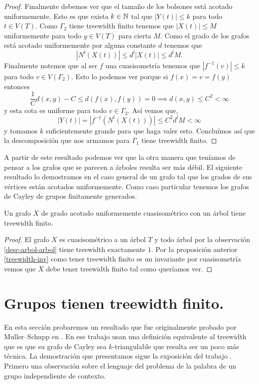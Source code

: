 \documentclass[tesis.tex]{subfiles}
\begin{document}
\begin{proof}
	Finalmente debemos ver que el tamaño de los bolsones está acotado uniformemente.
	Esto es que exista $k \in \mathbb{N}$ tal que $|Y(t)| \le k$ para todo $t \in V(T)$.
	Como $\Gamma_2$ tiene treewidth finito tenemos que $|X(t)| \le M$ uniformemente para todo $y \in V(T)$ para cierta $M$. 
	Como el grado de los grafos está acotado uniformemente por alguna constante $d$ tenemos que 
	\[
	|N^l(X(t))| \le d^l |X(t)| \le d^l M.
	\]
	Finalmente notemos que al ser $f$ una cuasisometría tenemos que $|f^{-1}(v)| \le k$ para todo $v \in V(\Gamma_2)$.
	Esto lo podemos ver porque si $f(x) = v = f(y)$ entonces
	\[
	\frac{1}{C}d(x,y) - C \le d( f(x), f(y) ) = 0 \implies d(x,y) \le C^2 < \infty
	\]
	y esta cota es uniforme para todo $v \in \Gamma_2$. 
	Así vemos que,
	\[
	|Y(t)| = |f^{-1}(N^l(X(t)))| \le C^2 d^l M < \infty
	\]
	y tomamos $k$ suficientemente grande para que haga valer esto.
	Concluímos así que la descomposición que nos armamos para $\Gamma_1$ tiene treewidth finito.
\end{proof}

A partir de este resultado podemos ver que la otra manera que teníamos de pensar a los grafos que se parecen a árboles resulta ser más débil. 
El siguiente resultado lo demostramos en el caso general de un grafo tal que los grados de sus vértices están acotados uniformemente. 
Como caso particular tenemos los grafos de Cayley de grupos finitamente generados.


\begin{prop} 
	Un grafo $X$ de grado acotado uniformemente cuasisométrico con un árbol tiene treewidth finito.
\end{prop}
\begin{proof}	
	El grafo $X$ es cuasisométrico a un árbol $T$ y todo árbol por la observación \ref{desc-arbol-arbol} tiene treewidth exactamente $1$.
	Por la proposición anterior \ref{treewidth-inv} como tener treewidth finito es un invariante por cuasisometría vemos que $X$ debe tener treewidth finito tal como queríamos ver.
\end{proof}

\section{Grupos \ic tienen treewidth finito.}

En esta sección probaremos un resultado que fue originalmente probado por Muller--Schupp en \cite{muller1985theory}.
En ese trabajo usan una definición equivalente al treewidth que es que su grafo de Cayley sea $k$-triangulable que resulta ser un poco más técnica.
La demostración que presentamos sigue la exposición del trabajo \cite{diekert2017context}.
Primero una observación sobre el lenguaje del problema de la palabra de un grupo independiente de contexto.
\end{document}
